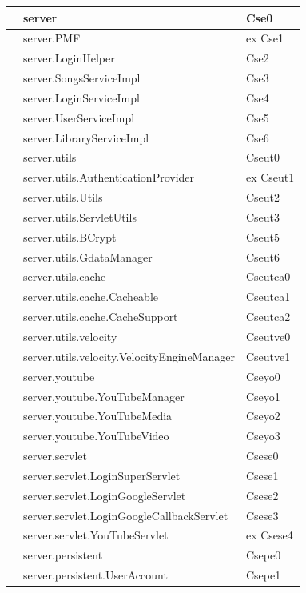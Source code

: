 \begin{footnotesize}
\begin{longtable}[h]{|l|l|l|}
& server  &  Cse0 \\\hline 
\bo{--} & server.PMF  &  ex Cse1 \\\hline 
& server.LoginHelper  &  Cse2 \\\hline 
& server.SongsServiceImpl  &  Cse3 \\\hline 
& server.LoginServiceImpl  &  Cse4 \\\hline 
& server.UserServiceImpl  &  Cse5 \\\hline 
& server.LibraryServiceImpl  &  Cse6 \\\hline 
& server.utils  &  Cseut0 \\\hline 
\bo{--} & server.utils.AuthenticationProvider  &  ex Cseut1 \\\hline 
& server.utils.Utils  &  Cseut2 \\\hline 
& server.utils.ServletUtils  &  Cseut3 \\\hline
\bo{+} & server.utils.BCrypt  &  Cseut5 \\\hline
\bo{+} & server.utils.GdataManager & Cseut6 \\\hline
\bo{+} & server.utils.cache & Cseutca0 \\\hline
\bo{+} & server.utils.cache.Cacheable & Cseutca1 \\\hline
\bo{+} & server.utils.cache.CacheSupport & Cseutca2 \\\hline
\bo{+} & server.utils.velocity & Cseutve0 \\\hline
\bo{+} & server.utils.velocity.VelocityEngineManager & Cseutve1 \\\hline
\bo{+} & server.youtube  &  Cseyo0 \\\hline
\bo{+} & server.youtube.YouTubeManager  &  Cseyo1 \\\hline
\bo{+} & server.youtube.YouTubeMedia  &  Cseyo2 \\\hline
\bo{+} & server.youtube.YouTubeVideo  &  Cseyo3 \\\hline
& server.servlet  &  Csese0 \\\hline 
& server.servlet.LoginSuperServlet  &  Csese1 \\\hline 
& server.servlet.LoginGoogleServlet  &  Csese2 \\\hline 
& server.servlet.LoginGoogleCallbackServlet  &  Csese3 \\\hline
\bo{--} & server.servlet.YouTubeServlet  &  ex Csese4 \\\hline
& server.persistent  &  Csepe0 \\\hline 
& server.persistent.UserAccount  &  Csepe1 \\\hline 

\end{longtable}
\end{footnotesize}
